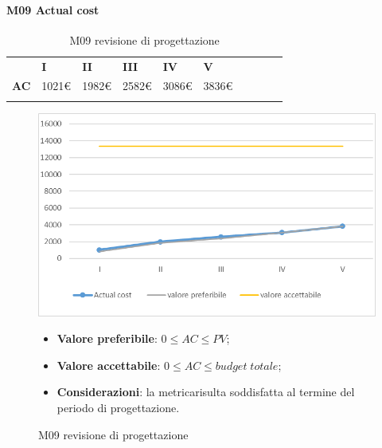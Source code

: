 \paragraph{M09 Actual cost} \mbox{}
\begin{longtable}[H!] {						
		>{}p{38mm}  		
		>{}p{12mm}
		>{}p{12mm}		
		>{}p{12mm}		
		>{}p{12mm}		
		>{}p{12mm}		
		>{}p{12mm}
		>{}p{12mm}
		>{}p{12mm}
		>{}p{12mm}
	}
	\rowcolor{gray!50}
	\textbf{} & \textbf{I} & \textbf{II} & \textbf{III} & \textbf{IV} & \textbf{V} \TBstrut \\ [2mm]
	\textbf{AC} & 1021\euro & 1982\euro & 2582\euro & 3086\euro & 3836\euro \TBstrut \\ [2mm]
	\rowcolor{white}
	\caption{M09 revisione di progettazione\glo}
\end{longtable}
\begin{figure}[H] 	
\includegraphics[width=\linewidth]{./img/grafici/RP6.png}	
\caption{M09 revisione di progettazione\glo}	
\begin{itemize}
	\item \textbf{Valore preferibile}: $0\le AC \le PV$;
	\item \textbf{Valore accettabile}: $0 \le AC \le budget \; totale$;
	\item \textbf{Considerazioni}: la metrica\glosp risulta soddisfatta al termine del periodo di progettazione\glo.
\end{itemize}
\end{figure}
